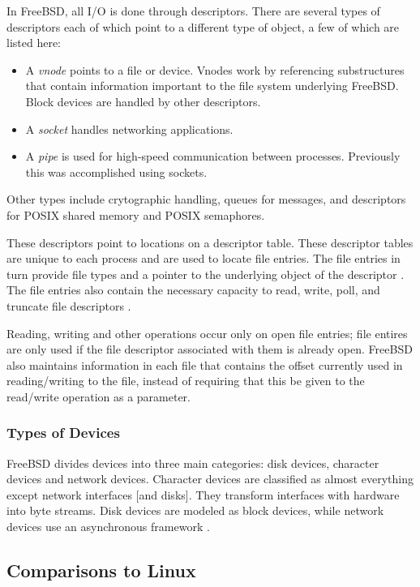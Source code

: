 \documentclass[10pt,draftclsnofoot,onecolumn,compsoc]{IEEEtran}
\begin{document}
	In FreeBSD, all I/O is done through descriptors. There are several types of descriptors each of which point to a different type of object, a few of which are listed here:
	\begin{itemize}
		\item A \textit{vnode} points to a file or device. Vnodes work by referencing substructures that contain information important to the file system underlying FreeBSD. Block devices are handled by other descriptors.
		\item A \textit{socket} handles networking applications.
		\item A \textit{pipe} is used for high-speed communication between processes. Previously this was accomplished using sockets.
	\end{itemize}

	Other types include crytographic handling, queues for messages, and descriptors for POSIX shared memory and POSIX semaphores.
	
	These descriptors point to locations on a descriptor table. These descriptor tables are unique to each process and are used to locate file entries. The file entries in turn provide file types and a pointer to the underlying object of the descriptor \cite{BSD}. The file entries also contain the necessary capacity to read, write, poll, and truncate file descriptors \cite{BSD}.
	
	Reading, writing and other operations occur only on open file entries; file entires are only used if the file descriptor associated with them is already open. FreeBSD also maintains information in each file that contains the offset currently used in reading/writing to the file, instead of requiring that this be given to the read/write operation as a parameter.
	
	\subsubsection{Types of Devices}
	
	FreeBSD divides devices into three main categories: disk devices, character devices and network devices. Character devices are classified as almost everything except network interfaces [and disks]. They transform interfaces with hardware into byte streams. Disk devices are modeled as block devices, while network devices use an asynchronous framework \cite{BSD}.
	
	\subsection{Comparisons to Linux}
	
\end{document}
